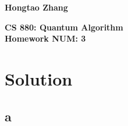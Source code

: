 \documentclass{article}%
\begin{document}
\newcommand{\ket}[1]{|#1\rangle}

\begin{flushright}
    \textbf{Hongtao Zhang \\}
\end{flushright}

\begin{center}
    \textbf{CS 880: Quantum Algorithm \\
        Homework NUM: 3} \\
\end{center}

\section*{Solution}

\subsection{a}
\end{document}

